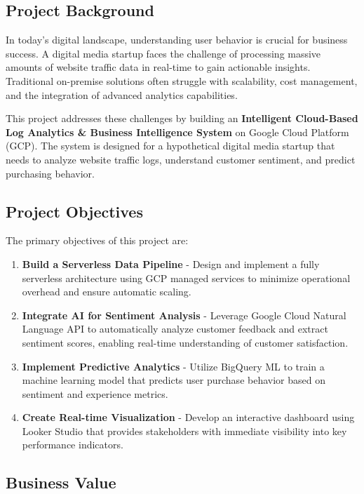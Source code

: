 \documentclass[12pt,a4paper]{article}
\begin{document}
\subsection{Project Background}

In today's digital landscape, understanding user behavior is crucial for business success. A digital media startup faces the challenge of processing massive amounts of website traffic data in real-time to gain actionable insights. Traditional on-premise solutions often struggle with scalability, cost management, and the integration of advanced analytics capabilities.

This project addresses these challenges by building an \textbf{Intelligent Cloud-Based Log Analytics \& Business Intelligence System} on Google Cloud Platform (GCP). The system is designed for a hypothetical digital media startup that needs to analyze website traffic logs, understand customer sentiment, and predict purchasing behavior.

\subsection{Project Objectives}

The primary objectives of this project are:

\begin{enumerate}
    \item \textbf{Build a Serverless Data Pipeline} - Design and implement a fully serverless architecture using GCP managed services to minimize operational overhead and ensure automatic scaling.
    
    \item \textbf{Integrate AI for Sentiment Analysis} - Leverage Google Cloud Natural Language API to automatically analyze customer feedback and extract sentiment scores, enabling real-time understanding of customer satisfaction.
    
    \item \textbf{Implement Predictive Analytics} - Utilize BigQuery ML to train a machine learning model that predicts user purchase behavior based on sentiment and experience metrics.
    
    \item \textbf{Create Real-time Visualization} - Develop an interactive dashboard using Looker Studio that provides stakeholders with immediate visibility into key performance indicators.
\end{enumerate}

\subsection{Business Value}
\end{document}
